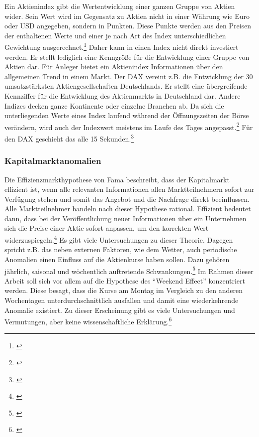 Ein Aktienindex gibt die Wertentwicklung einer ganzen Gruppe von Aktien wider. Sein Wert wird im Gegensatz zu Aktien nicht in einer Währung wie Euro oder \gls{USD} angegeben, sondern in Punkten. Diese Punkte werden aus den Preisen der enthaltenen Werte und einer je nach Art des Index unterschiedlichen Gewichtung ausgerechnet.\footnote{\cite[Vgl.][61]{Daume2021}} Daher kann in einen Index nicht direkt investiert werden. Er stellt lediglich eine Kenngröße für die Entwicklung einer Gruppe von Aktien dar. Für Anleger bietet ein Aktienindex Informationen über den allgemeinen Trend in einem Markt. Der \gls{DAX} vereint z.B. die Entwicklung der 30 umsatzstärksten Aktiengesellschaften Deutschlands. Er stellt eine übergreifende Kennziffer für die Entwicklung des Aktienmarkts in Deutschland dar. Andere Indizes decken ganze Kontinente oder einzelne Branchen ab. Da sich die unterliegenden Werte eines Index laufend während der Öffnungszeiten der Börse verändern, wird auch der Indexwert meistens im Laufe des Tages angepasst.\footnote{\cite[Vgl.][110]{Grundmann2021}} Für den \gls{DAX} geschieht das alle 15 Sekunden.\footnote{\cite[Vgl.][63]{Daume2021}}

\subsubsection{Kapitalmarktanomalien}



Die Effizienzmarkthypothese von Fama beschreibt, dass der Kapitalmarkt effizient ist, wenn alle relevanten Informationen allen Marktteilnehmern sofort zur Verfügung stehen und somit das Angebot und die Nachfrage direkt beeinflussen. Alle Marktteilnehmer handeln nach dieser Hypothese rational. Effizient bedeutet dann, dass bei der Veröffentlichung neuer Informationen über ein Unternehmen sich die Preise einer Aktie sofort anpassen, um den korrekten Wert widerzuspiegeln.\footnote{\cite[Vgl.][9\psq]{Wagner2019}} Es gibt viele Untersuchungen zu dieser Theorie. Dagegen spricht z.B. das neben externen Faktoren, wie dem Wetter, auch periodische Anomalien einen Einfluss auf die Aktienkurse haben sollen. Dazu gehören jährlich, saisonal und wöchentlich auftretende Schwankungen.\footnote{\cite[Vgl.][5\psq]{Coenen2020}} Im Rahmen dieser Arbeit soll sich vor allem auf die Hypothese des \enquote{Weekend Effect} konzentriert werden. Diese besagt, dass die Kurse am Montag im Vergleich zu den anderen Wochentagen unterdurchschnittlich ausfallen und damit eine wiederkehrende Anomalie existiert. Zu dieser Erscheinung gibt es viele Untersuchungen und Vermutungen, aber keine wissenschaftliche Erklärung.\footnote{\cite[Vgl.][8]{Coenen2020}}

